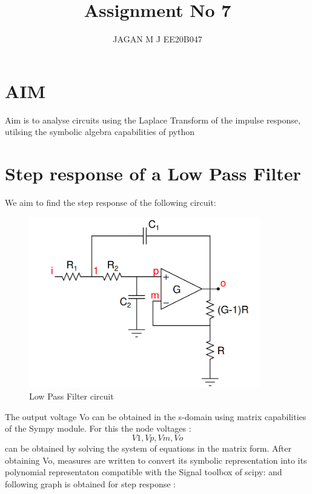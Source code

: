 \documentclass[10pt,a4paper]{article}
\date{}
\begin{document}
\title{Assignment No 7}
\author{JAGAN M J EE20B047}
\maketitle


\section{AIM}

Aim is to analyse circuits using the Laplace Transform of the impulse response, utilsing the symbolic algebra capabilities of python

\section{Step response of a Low Pass Filter}
We aim to find the step response of the following circuit:

\begin{figure}[!tbh]

\includegraphics[width = 0.9\textwidth]{low pass filter circuit.png}
\caption{Low Pass Filter circuit}

\end{figure}

The output voltage Vo can be obtained in the s-domain using matrix capabilities of the Sympy module. For this the node voltages : \[ V1,  Vp,  Vm,  Vo \] can be obtained by solving the system of equations in the matrix form. After obtaining Vo, measures are written to convert its symbolic representation into its polynomial representaton compatible with the Signal toolbox of scipy: and following graph is obtained for step response :\\ \\ \\ \\ \\ \\ \\ \\ 
\end{document}
